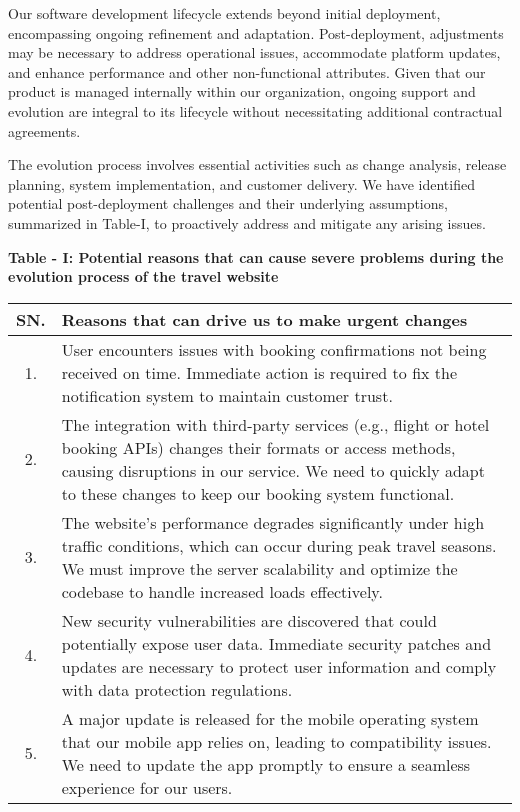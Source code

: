 \documentclass{scrreprt}
\begin{document}
Our software development lifecycle extends beyond initial deployment, encompassing ongoing refinement and adaptation. Post-deployment, adjustments may be necessary to address operational issues, accommodate platform updates, and enhance performance and other non-functional attributes. Given that our product is managed internally within our organization, ongoing support and evolution are integral to its lifecycle without necessitating additional contractual agreements.

The evolution process involves essential activities such as change analysis, release planning, system implementation, and customer delivery. We have identified potential post-deployment challenges and their underlying assumptions, summarized in Table-I, to proactively address and mitigate any arising issues.

\begin{center}
    \parbox{0.8\textwidth}{ 
        \centering
        \textbf{Table - I: Potential reasons that can cause severe problems during the evolution process of the travel website}
    }
\end{center}

\begin{table}[h!]
\centering
\begin{tabular}{|c|>{\raggedright\arraybackslash}p{13cm}|}
\hline
\textbf{SN.} & \textbf{Reasons that can drive us to make urgent changes} \\
\hline
1. & User encounters issues with booking confirmations not being received on time. Immediate action is required to fix the notification system to maintain customer trust. \\
\hline
2. & The integration with third-party services (e.g., flight or hotel booking APIs) changes their formats or access methods, causing disruptions in our service. We need to quickly adapt to these changes to keep our booking system functional. \\
\hline
3. & The website's performance degrades significantly under high traffic conditions, which can occur during peak travel seasons. We must improve the server scalability and optimize the codebase to handle increased loads effectively. \\
\hline
4. & New security vulnerabilities are discovered that could potentially expose user data. Immediate security patches and updates are necessary to protect user information and comply with data protection regulations. \\
\hline
5. & A major update is released for the mobile operating system that our mobile app relies on, leading to compatibility issues. We need to update the app promptly to ensure a seamless experience for our users. \\
\hline
\end{tabular}
\end{table}
\end{document}
